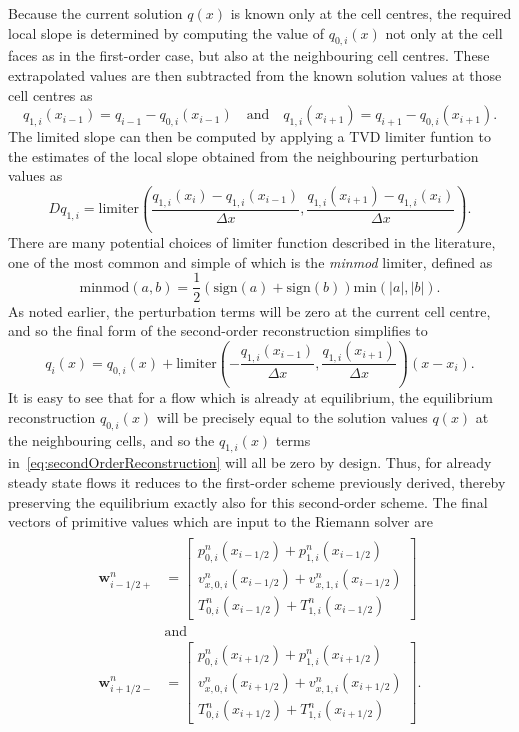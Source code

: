 Because the current solution $q(x)$ is known only at the cell centres, the required local slope is determined by computing the value of $q_{0,i}(x)$ not only at the cell faces as in the first-order case, but also at the neighbouring cell centres. These extrapolated values are then subtracted from the known solution values at those cell centres as
\begin{equation}
q_{1,i}(x_{i-1})=q_{i-1}-q_{0,i}(x_{i-1})\quad \textrm{and}\quad q_{1,i}(x_{i+1})=q_{i+1}-q_{0,i}(x_{i+1}).
\end{equation}
The limited slope can then be computed by applying a TVD limiter funtion to the estimates of the local slope obtained from the neighbouring perturbation values as
\begin{equation}
Dq_{1,i}=\textrm{limiter}\left(\frac{q_{1,i}(x_i)-q_{1,i}(x_{i-1})}{\Delta x},\frac{q_{1,i}(x_{i+1})-q_{1,i}(x_i)}{\Delta x}\right).
\end{equation}
There are many potential choices of limiter function described in the literature, one of the most common and simple of which is the \emph{minmod} limiter, defined as
\begin{equation}
\textrm{minmod}(a,b)=\frac{1}{2}\left(\textrm{sign}(a)+\textrm{sign}(b)\right)\textrm{min}\left(|a|,|b|\right).
\end{equation}
As noted earlier, the perturbation terms will be zero at the current cell centre, and so the final form of the second-order reconstruction simplifies to
\begin{equation} \label{eq:secondOrderReconstruction}
q_i(x)=q_{0,i}(x)+\textrm{limiter}\left(-\frac{q_{1,i}(x_{i-1})}{\Delta x},\frac{q_{1,i}(x_{i+1})}{\Delta x}\right)(x-x_i).
\end{equation}
It is easy to see that for a flow which is already at equilibrium, the equilibrium reconstruction $q_{0,i}(x)$ will be precisely equal to the solution values $q(x)$ at the neighbouring cells, and so the $q_{1,i}(x)$ terms in~\eqref{eq:secondOrderReconstruction} will all be zero by design. Thus, for already steady state flows it reduces to the first-order scheme previously derived, thereby preserving the equilibrium exactly also for this second-order scheme. The final vectors of primitive values which are input to the Riemann solver are
\begin{align} \label{eq:primitives1D2}
\begin{split}
\mathbf{w}_{i-1/2+}^n&=
\begin{bmatrix}
p_{0,i}^n(x_{i-1/2})+p_{1,i}^n(x_{i-1/2}) \\ v_{x,0,i}^n(x_{i-1/2})+v_{x,1,i}^n(x_{i-1/2}) \\ T_{0,i}^n(x_{i-1/2})+T_{1,i}^n(x_{i-1/2})
\end{bmatrix} \\
&\textrm{and} \\
\mathbf{w}_{i+1/2-}^n&=
\begin{bmatrix}
p_{0,i}^n(x_{i+1/2})+p_{1,i}^n(x_{i+1/2}) \\ v_{x,0,i}^n(x_{i+1/2})+ v_{x,1,i}^n(x_{i+1/2}) \\ T_{0,i}^n(x_{i+1/2})+T_{1,i}^n(x_{i+1/2})
\end{bmatrix}.
\end{split}
\end{align}
